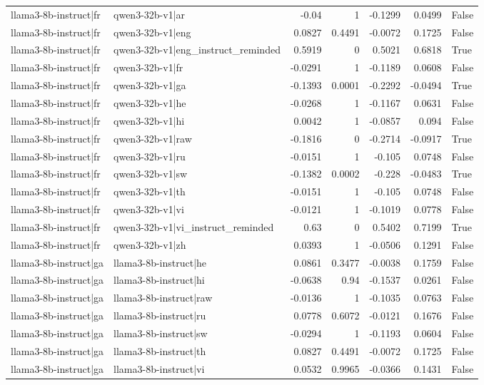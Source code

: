 \begin{table}
\begin{tabular}{l l r r r r l}
llama3-8b-instruct|fr & qwen3-32b-v1|ar & -0.04 & 1 & -0.1299 & 0.0499 & False \\
llama3-8b-instruct|fr & qwen3-32b-v1|eng & 0.0827 & 0.4491 & -0.0072 & 0.1725 & False \\
llama3-8b-instruct|fr & qwen3-32b-v1|eng_instruct_reminded & 0.5919 & 0 & 0.5021 & 0.6818 & True \\
llama3-8b-instruct|fr & qwen3-32b-v1|fr & -0.0291 & 1 & -0.1189 & 0.0608 & False \\
llama3-8b-instruct|fr & qwen3-32b-v1|ga & -0.1393 & 0.0001 & -0.2292 & -0.0494 & True \\
llama3-8b-instruct|fr & qwen3-32b-v1|he & -0.0268 & 1 & -0.1167 & 0.0631 & False \\
llama3-8b-instruct|fr & qwen3-32b-v1|hi & 0.0042 & 1 & -0.0857 & 0.094 & False \\
llama3-8b-instruct|fr & qwen3-32b-v1|raw & -0.1816 & 0 & -0.2714 & -0.0917 & True \\
llama3-8b-instruct|fr & qwen3-32b-v1|ru & -0.0151 & 1 & -0.105 & 0.0748 & False \\
llama3-8b-instruct|fr & qwen3-32b-v1|sw & -0.1382 & 0.0002 & -0.228 & -0.0483 & True \\
llama3-8b-instruct|fr & qwen3-32b-v1|th & -0.0151 & 1 & -0.105 & 0.0748 & False \\
llama3-8b-instruct|fr & qwen3-32b-v1|vi & -0.0121 & 1 & -0.1019 & 0.0778 & False \\
llama3-8b-instruct|fr & qwen3-32b-v1|vi_instruct_reminded & 0.63 & 0 & 0.5402 & 0.7199 & True \\
llama3-8b-instruct|fr & qwen3-32b-v1|zh & 0.0393 & 1 & -0.0506 & 0.1291 & False \\
llama3-8b-instruct|ga & llama3-8b-instruct|he & 0.0861 & 0.3477 & -0.0038 & 0.1759 & False \\
llama3-8b-instruct|ga & llama3-8b-instruct|hi & -0.0638 & 0.94 & -0.1537 & 0.0261 & False \\
llama3-8b-instruct|ga & llama3-8b-instruct|raw & -0.0136 & 1 & -0.1035 & 0.0763 & False \\
llama3-8b-instruct|ga & llama3-8b-instruct|ru & 0.0778 & 0.6072 & -0.0121 & 0.1676 & False \\
llama3-8b-instruct|ga & llama3-8b-instruct|sw & -0.0294 & 1 & -0.1193 & 0.0604 & False \\
llama3-8b-instruct|ga & llama3-8b-instruct|th & 0.0827 & 0.4491 & -0.0072 & 0.1725 & False \\
llama3-8b-instruct|ga & llama3-8b-instruct|vi & 0.0532 & 0.9965 & -0.0366 & 0.1431 & False \\

\end{tabular}
\end{table}

